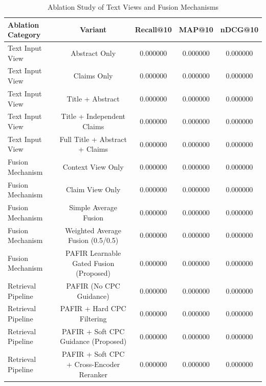 \begin{table}
\caption{Ablation Study of Text Views and Fusion Mechanisms}
\label{tab:ablation}
\begin{tabular}{lcccc}
\toprule
Ablation Category & Variant & Recall@10 & MAP@10 & nDCG@10 \\
\midrule
Text Input View & Abstract Only & 0.000000 & 0.000000 & 0.000000 \\
Text Input View & Claims Only & 0.000000 & 0.000000 & 0.000000 \\
Text Input View & Title + Abstract & 0.000000 & 0.000000 & 0.000000 \\
Text Input View & Title + Independent Claims & 0.000000 & 0.000000 & 0.000000 \\
Text Input View & Full Title + Abstract + Claims & 0.000000 & 0.000000 & 0.000000 \\
Fusion Mechanism & Context View Only & 0.000000 & 0.000000 & 0.000000 \\
Fusion Mechanism & Claim View Only & 0.000000 & 0.000000 & 0.000000 \\
Fusion Mechanism & Simple Average Fusion & 0.000000 & 0.000000 & 0.000000 \\
Fusion Mechanism & Weighted Average Fusion (0.5/0.5) & 0.000000 & 0.000000 & 0.000000 \\
Fusion Mechanism & PAFIR Learnable Gated Fusion (Proposed) & 0.000000 & 0.000000 & 0.000000 \\
Retrieval Pipeline & PAFIR (No CPC Guidance) & 0.000000 & 0.000000 & 0.000000 \\
Retrieval Pipeline & PAFIR + Hard CPC Filtering & 0.000000 & 0.000000 & 0.000000 \\
Retrieval Pipeline & PAFIR + Soft CPC Guidance (Proposed) & 0.000000 & 0.000000 & 0.000000 \\
Retrieval Pipeline & PAFIR + Soft CPC + Cross-Encoder Reranker & 0.000000 & 0.000000 & 0.000000 \\
\bottomrule
\end{tabular}
\end{table}
